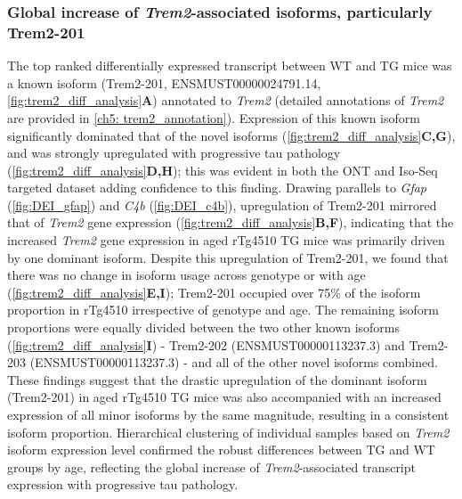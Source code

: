 \subsubsection{Global increase of \textit{Trem2}-associated isoforms, particularly Trem2-201}
The top ranked differentially expressed transcript between WT and TG mice was a known isoform (Trem2-201, ENSMUST00000024791.14, \cref{fig:trem2_diff_analysis}\textbf{A}) annotated to \textit{Trem2} (detailed annotations of \textit{Trem2} are provided in \cref{ch5: trem2_annotation}). Expression of this known isoform significantly dominated that of the novel isoforms (\cref{fig:trem2_diff_analysis}\textbf{C,G}), and was strongly upregulated with progressive tau pathology (\cref{fig:trem2_diff_analysis}\textbf{D,H}); this was evident in both the ONT and Iso-Seq targeted dataset adding confidence to this finding. Drawing parallels to \textit{Gfap} (\cref{fig:DEI_gfap}) and \textit{C4b} (\cref{fig:DEI_c4b}), upregulation of Trem2-201 mirrored that of \textit{Trem2} gene expression (\cref{fig:trem2_diff_analysis}\textbf{B,F}), indicating that the increased \textit{Trem2} gene expression in aged rTg4510 TG mice was primarily driven by one dominant isoform. Despite this upregulation of Trem2-201, we found that there was no change in isoform usage across genotype or with age (\cref{fig:trem2_diff_analysis}\textbf{E,I}); Trem2-201 occupied over 75\% of the isoform proportion in rTg4510 irrespective of genotype and age. The remaining isoform proportions were equally divided between the two other known isoforms (\cref{fig:trem2_diff_analysis}\textbf{I}) - Trem2-202 (ENSMUST00000113237.3) and Trem2-203 (ENSMUST00000113237.3) - and all of the other novel isoforms combined. These findings suggest that the drastic upregulation of the dominant isoform (Trem2-201) in aged rTg4510 TG mice was also accompanied with an increased expression of all minor isoforms by the same magnitude, resulting in a consistent isoform proportion. Hierarchical clustering of individual samples based on \textit{Trem2} isoform expression level confirmed the robust differences between TG and WT groups by age, reflecting the global increase of \textit{Trem2}-associated transcript expression with progressive tau pathology.  

